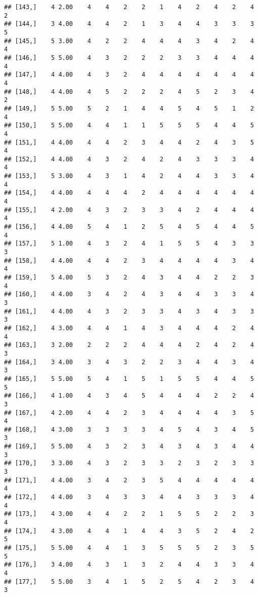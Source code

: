 \documentclass[]{article}
\begin{document}
\begin{verbatim}
## [143,]    4 2.00    4    4    2    2    1    4    2    4    2    4    2
## [144,]    3 4.00    4    4    2    1    3    4    4    3    3    3    5
## [145,]    5 3.00    4    2    2    4    4    4    3    4    2    4    4
## [146,]    5 5.00    4    3    2    2    2    3    3    4    4    4    4
## [147,]    4 4.00    4    3    2    4    4    4    4    4    4    4    4
## [148,]    4 4.00    4    5    2    2    2    4    5    2    3    4    2
## [149,]    5 5.00    5    2    1    4    4    5    4    5    1    2    4
## [150,]    5 5.00    4    4    1    1    5    5    5    4    4    5    4
## [151,]    4 4.00    4    4    2    3    4    4    2    4    3    5    4
## [152,]    4 4.00    4    3    2    4    2    4    3    3    3    4    4
## [153,]    5 3.00    4    3    1    4    2    4    4    3    3    4    4
## [154,]    4 4.00    4    4    4    2    4    4    4    4    4    4    4
## [155,]    4 2.00    4    3    2    3    3    4    2    4    4    4    4
## [156,]    4 4.00    5    4    1    2    5    4    5    4    4    5    4
## [157,]    5 1.00    4    3    2    4    1    5    5    4    3    3    3
## [158,]    4 4.00    4    4    2    3    4    4    4    4    3    4    4
## [159,]    5 4.00    5    3    2    4    3    4    4    2    2    3    4
## [160,]    4 4.00    3    4    2    4    3    4    4    3    3    4    3
## [161,]    4 4.00    4    3    2    3    3    4    3    4    3    3    3
## [162,]    4 3.00    4    4    1    4    3    4    4    4    2    4    4
## [163,]    3 2.00    2    2    2    4    4    4    2    4    2    4    3
## [164,]    3 4.00    3    4    3    2    2    3    4    4    3    4    3
## [165,]    5 5.00    5    4    1    5    1    5    5    4    4    5    5
## [166,]    4 1.00    4    3    4    5    4    4    4    2    2    4    3
## [167,]    4 2.00    4    4    2    3    4    4    4    4    3    5    4
## [168,]    4 3.00    3    3    3    3    4    5    4    3    4    5    3
## [169,]    5 5.00    4    3    2    3    4    3    4    3    4    4    3
## [170,]    3 3.00    4    3    2    3    3    2    3    2    3    3    3
## [171,]    4 4.00    3    4    2    3    5    4    4    4    4    4    4
## [172,]    4 4.00    3    4    3    3    4    4    3    3    3    4    4
## [173,]    4 3.00    4    4    2    2    1    5    5    2    2    3    4
## [174,]    4 3.00    4    4    1    4    4    3    5    2    4    2    5
## [175,]    5 5.00    4    4    1    3    5    5    5    2    3    5    5
## [176,]    3 4.00    4    3    1    3    2    4    4    3    3    4    4
## [177,]    5 5.00    3    4    1    5    2    5    4    2    3    4    3

\end{verbatim}
\end{document}
